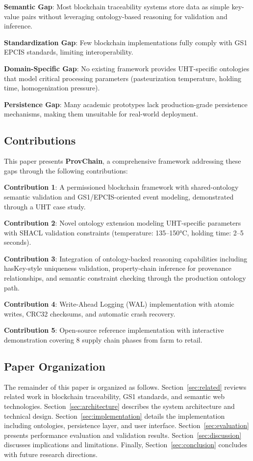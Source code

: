 \documentclass[preprint,review,12pt,authoryear]{elsarticle}
\begin{document}
\textbf{Semantic Gap}: Most blockchain traceability systems store data as simple key-value pairs without leveraging ontology-based reasoning for validation and inference.

\textbf{Standardization Gap}: Few blockchain implementations fully comply with GS1 EPCIS standards, limiting interoperability.

\textbf{Domain-Specific Gap}: No existing framework provides UHT-specific ontologies that model critical processing parameters (pasteurization temperature, holding time, homogenization pressure).

\textbf{Persistence Gap}: Many academic prototypes lack production-grade persistence mechanisms, making them unsuitable for real-world deployment.

\subsection{Contributions}

This paper presents \textbf{ProvChain}, a comprehensive framework addressing these gaps through the following contributions:

\textbf{Contribution 1}: A permissioned blockchain framework with shared-ontology semantic validation and GS1/EPCIS-oriented event modeling, demonstrated through a UHT case study.

\textbf{Contribution 2}: Novel ontology extension modeling UHT-specific parameters with SHACL validation constraints (temperature: 135--150°C, holding time: 2--5 seconds).

\textbf{Contribution 3}: Integration of ontology-backed reasoning capabilities including hasKey-style uniqueness validation, property-chain inference for provenance relationships, and semantic constraint checking through the production ontology path.

\textbf{Contribution 4}: Write-Ahead Logging (WAL) implementation with atomic writes, CRC32 checksums, and automatic crash recovery.

\textbf{Contribution 5}: Open-source reference implementation with interactive demonstration covering 8 supply chain phases from farm to retail.

\subsection{Paper Organization}

The remainder of this paper is organized as follows. Section~\ref{sec:related} reviews related work in blockchain traceability, GS1 standards, and semantic web technologies. Section~\ref{sec:architecture} describes the system architecture and technical design. Section~\ref{sec:implementation} details the implementation including ontologies, persistence layer, and user interface. Section~\ref{sec:evaluation} presents performance evaluation and validation results. Section~\ref{sec:discussion} discusses implications and limitations. Finally, Section~\ref{sec:conclusion} concludes with future research directions.
\end{document}
